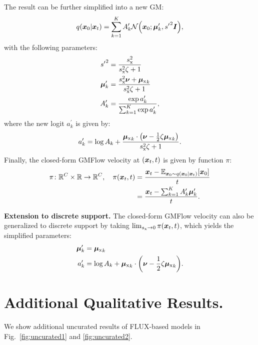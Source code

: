 The result can be further simplified into a new GM:
\begin{align}
    q(\vx_0|\vx_t) = \sum_{k=1}^K A_k^\prime \mathcal{N}\left( \vx_0 ; \vmu_k^\prime, {s^\prime}^2 \mI \right),
\label{eq:gm_posterior}
\end{align}
with the following parameters:
\begin{align}
    {s^\prime}^2 &= \frac{
        s_\text{x}^2
    }{
        s_\text{x}^2 \zeta
        + 1
    } \\
    {\bm{\mu}}_k^\prime &= \frac{
        s_\text{x}^2 {\bm{\nu}}
        + {{\bm{\mu}}_\text{x}}_k
    }{
        s_\text{x}^2 \zeta
        + 1
    } \\
    A_k^\prime &= \frac{\exp a_k^\prime}{\sum_{k=1}^K \exp a_k^\prime},
\end{align}
where the new  logit $a_k^\prime$ is given by:
\begin{align}
    a_k^\prime = \log A_k + \frac{
        {\vmu_\text{x}}_k \cdot \left(\vnu - \frac{1}{2} \zeta {\vmu_\text{x}}_k \right)
    }{
        s_\text{x}^2 \zeta  + 1
    }.
\end{align}
Finally, the closed-form GMFlow velocity at $({\bm{x}}_t, t)$ is given by function $\pi$:
\begin{align}
    \pi\colon \mathbb{R}^C \times \mathbb{R} \to \mathbb{R}^C, \quad \pi ({\bm{x}}_t, t) &= \frac{{\bm{x}}_t - \mathbb{E}_{{\bm{x}}_0 \sim q({\bm{x}}_0 | {\bm{x}}_t)}[{\bm{x}}_0]}{t} \notag \\
    &= \frac{{\bm{x}}_t - \sum_{k=1}^K A_k^\prime {\bm{\mu}}_k^\prime}{t}.
\end{align}

\textbf{Extension to discrete support.}
The closed-form GMFlow velocity can also be generalized to discrete support by taking $\lim_{s_\text{x} \to 0} \pi ({\bm{x}}_t, t)$, which yields the simplified parameters:
\begin{align}
    \vmu_k^\prime &= {\vmu_\text{x}}_k \\
    a_k^\prime &= \log A_k + {\vmu_\text{x}}_k \cdot \left(\vnu - \frac{1}{2} \zeta {\vmu_\text{x}}_k \right).
\end{align}

\section{Additional Qualitative Results.}
We show additional uncurated results of FLUX-based models in Fig.~\ref{fig:uncurated1} and \ref{fig:uncurated2}.

